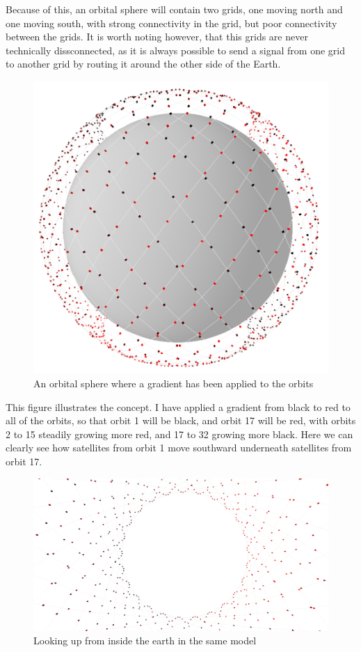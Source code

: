 \documentclass[12pt]{article}
\begin{document}
Because of this, an orbital sphere will contain two grids, one moving north and one moving south, with strong connectivity in the grid, but poor connectivity between the grids. It is worth noting however, that this grids are never technically dissconnected, as it is always possible to send a signal from one grid to another grid by routing it around the other side of the Earth.

\begin{figure}
\label{Upward and Downward Moving Satellites}
\caption{An orbital sphere where a gradient has been applied to the orbits}
\includegraphics[width=\textwidth]{UpwardAndDowardMovingSatellites}
\end{figure}

This figure illustrates the concept. I have applied a gradient from black to red to all of the orbits, so that orbit 1 will be black, and orbit 17 will be red, with orbits 2 to 15 steadily growing more red, and 17 to 32 growing more black. Here we can clearly see how satellites from orbit 1 move southward underneath satellites from orbit 17.

\begin{figure}
\label{Looking up at Upward and Downward Satellites}
\caption{Looking up from inside the earth in the same model}
\includegraphics[width=\textwidth]{LookingUpAtUpwardAndDownwardSatellites}
\end{figure}
\end{document}
